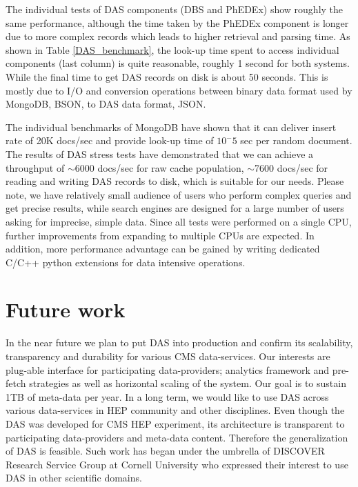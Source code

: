 \documentclass[1p,times]{elsarticle}
\begin{document}
The individual tests of DAS components (DBS and PhEDEx) show roughly 
the same performance, although the time taken by the PhEDEx component is longer
due to more complex records which leads to higher retrieval and parsing time. 
As shown in Table \ref{DAS_benchmark},
the look-up time spent to access individual components (last column) is quite
reasonable, roughly 1 second for both systems. While the final time to
get DAS records on disk is about 50 seconds. This is mostly due to I/O and
conversion operations between binary data format used by MongoDB, BSON, to DAS
data format, JSON.

The individual benchmarks of MongoDB have shown that it can deliver insert rate of
20K docs/sec and provide look-up time of $10^-5$ sec per random document.
The results of DAS stress tests have demonstrated that we can achieve a throughput of
$\sim$6000 docs/sec for raw cache population, 
$\sim$7600 docs/sec for reading and writing DAS records to disk,
which is suitable for our needs. 
Please note, we have relatively small audience of users
who perform complex queries and get precise results, while search 
engines are designed for a large number of users asking for imprecise, simple data.
Since all tests were performed on a single CPU, further improvements from
expanding to multiple CPUs are expected. In addition, more
performance advantage can be gained by writing dedicated C/C++
python extensions for data intensive operations.

\section{Future work}
In the near future we plan to put DAS into production and confirm its scalability, 
transparency and durability for various CMS data-services. 
Our interests are plug-able interface for participating data-providers;
analytics framework and pre-fetch strategies as well as horizontal scaling of the
system. Our goal is to sustain 1TB of meta-data per year. 
In a long term, we would like to use DAS across various
data-services in HEP community and other disciplines. Even though the DAS was developed
for CMS HEP experiment, its architecture is transparent to participating 
data-providers and meta-data content. Therefore the generalization of DAS is feasible.
Such work has began under the umbrella of DISCOVER Research Service Group at 
Cornell University \cite{DRSG} who expressed their interest to use DAS in other 
scientific domains.
\end{document}
